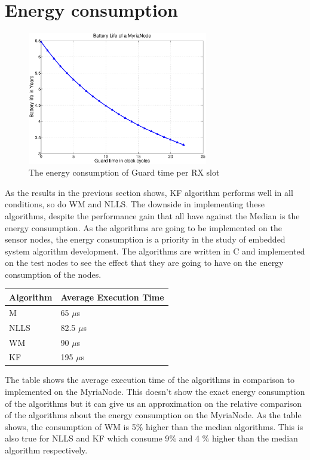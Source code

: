 \documentclass[a4paper,10pt]{report}
\begin{document}
\section{\textbf{Energy consumption}}
\begin{figure}
\centering
\includegraphics[width=0.7\textwidth]{guardsave}
\caption{The energy consumption of Guard time per RX slot}
\label{guardsave}
\end{figure}
As the results in the previous section shows, KF algorithm performs well in all conditions, so do WM and NLLS. The downside in
implementing these algorithms, despite the performance gain that all have against the Median is the energy consumption. As the algorithms are going to be implemented on the sensor nodes, the energy consumption is a priority in the study of embedded system algorithm development. The algorithms are written in C and implemented on the test nodes to see the effect that they are going to have on the energy consumption of the nodes.
\begin{center}
    \begin{tabular}{ |p{2cm} | p{4.75cm} |}
    \hline
    Algorithm & Average Execution Time \\ \hline
    M &  65 $\mu$s \\ \hline
    NLLS & 82.5 $\mu$s \\ \hline
    WM &   90 $\mu$s \\ \hline
    KF &  195 $\mu$s  \\ \hline
    \end{tabular}
\label{tab}
\end{center}
The table shows the average execution time of the algorithms in comparison to implemented on the MyriaNode. This doesn't show the
exact energy consumption of the algorithms but it can give us an approximation on the relative comparison of the algorithms about the energy consumption on the MyriaNode. As the table shows, the consumption of WM is 5$\%$ higher than the median algorithms. This
is also true for NLLS and KF which consume 9$\%$ and 4 $\%$ higher than the median algorithm respectively.
\end{document}
